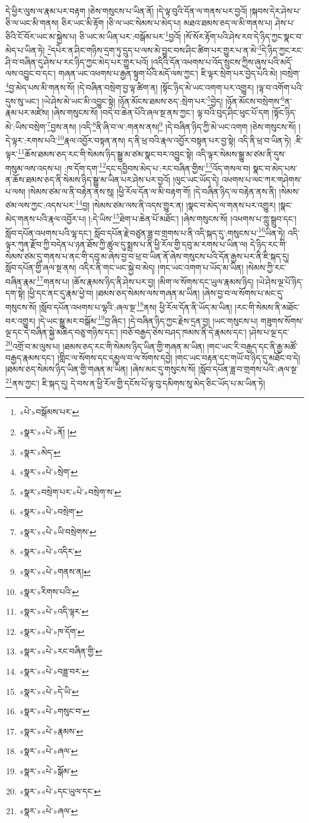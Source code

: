 དེ་ཕྱིར་ལུས་ལ་རྣམ་པར་བརྟག །ཅེས་གསུངས་པ་ཡིན་ནོ། །དེ་ལྟ་བུའི་དོན་ལ་གནས་པར་བྱའོ། །སྐབས་དེར་ཤེས་པ་ཅི་ལ་ཡང་མི་གནས། ཅིར་ཡང་མི་རྟོག །ཅི་ལ་ཡང་སེམས་པ་མེད་པ། མཐའ་ཐམས་ཅད་ལ་མི་གནས་པ། ཤེས་པ་ཅིའི་ངོ་བོར་ཡང་མ་སྐྱེས་པ། ཅི་ཡང་མ་ཡིན་པར་:བསྒོམ་པར་\footnote{«པེ་»བསྒོམས་པར་}བྱའོ། །སོ་སོར་རྟོག་པའི་ཤེས་རབ་དེ་ཉིད་ཀྱང་སྣང་བ་མེད་པ་ཡིན་ཏེ། \footnote{«སྣར་»«པེ་»ནོ། ། }དཔེར་ན་ཤིང་གཉིས་དྲག་ཏུ་དྲུད་པ་ལས་མེ་བྱུང་བས་ཤིང་ཚིག་པར་གྱུར་པ་ན་མེ་\footnote{«སྣར་»མེད་}དེ་ཉིད་ཀྱང་རང་ཤི་བ་བཞིན་དུ་ཤེས་པ་རང་ཉིད་ཀྱང་མེད་པར་གྱུར་པའོ། །འདིའི་དོན་འཕགས་པ་འོད་སྲུངས་ཀྱིས་ཞུས་པའི་མདོ་ལས་འབྱུང་བ་དང་། གཞན་ཡང་འཕགས་པ་རྒྱན་སྟུག་པོའི་མདོ་ལས་ཀྱང་། ཇི་ལྟར་སྲེག་པར་བྱེད་པའི་མེ། །བསྲེག་\footnote{«སྣར་»«པེ་»སྲེག་}བྱ་མེད་པས་མི་གནས་སོ། །དེ་བཞིན་བསྲེག་བྱ་ལྟ་ཚིག་ན། །སྟོང་ཉིད་མེ་ཡང་འགག་པར་འགྱུར། །ལྟ་བ་འགོག་པའི་དུས་སུ་ཡང་། །ཡེ་ཤེས་མེ་ཡང་མི་འབྱུང་སྟེ། །ཉོན་མོངས་ཐམས་ཅད་:སྲེག་པར་\footnote{«སྣར་»བསྲེག་པར་«པེ་»བསྲེག་ས་}བྱེད། །ཉོན་མོངས་བསྲེགས་\footnote{«སྣར་»«པེ་»བསྲེག་}ན་རྣམ་པར་མཛེས། །ཞེས་གསུངས་སོ། །བདེ་བ་ཆེན་པོའི་ཞལ་སྔ་ནས་ཀྱང་། ལྟ་བའི་བུད་ཤིང་ཕུང་པོ་དག །སྟོང་ཉིད་མེ་:ཡིས་བསྲེག་\footnote{«སྣར་»«པེ་»ཡི་བསྲེགས་}བྱས་ནས། །འདི་\footnote{«སྣར་»«པེ་»འདིར་}ནི་ཞི་བ་ལ་:གནས་ནས།\footnote{«སྣར་»«པེ་»གནས་ན།} །དེ་བཞིན་ཉིད་ཀྱི་མེ་ཡང་འགག །ཅེས་གསུངས་སོ། །དེ་ལྟར་:རགས་པའི་\footnote{«སྣར་»རིགས་པའི་}རྣལ་འབྱོར་བསྟན་ནས། ད་ནི་ཕྲ་བའི་རྣལ་འབྱོར་བསྟན་པར་བྱ་སྟེ། འདི་ནི་ཕྲ་བ་ཡིན་ཏེ། :ཇི་ལྟར་\footnote{«སྣར་»«པེ་»འདི་ལྟར་}ཆོས་ཐམས་ཅད་རང་གི་སེམས་ཉིད་སྒྱུ་མ་ཙམ་སྣང་བར་འབྱུང་སྟེ། འདི་ལྟར་སེམས་སྒྱུ་མ་ཙམ་ནི་དུས་གསུམ་ལས་འདས་པ། :ཁ་དོག་དག་\footnote{«སྣར་»«པེ་»ཁ་དོག་}དང་དབྱིབས་མེད་པ་:རང་བཞིན་གྱིས་\footnote{«སྣར་»«པེ་»རང་བཞིན་གྱི་}འོད་གསལ་བ། སྣང་བ་མེད་པས་ན་ཆོས་ཐམས་ཅད་ནི་སེམས་ཉིད་སྒྱུ་མ་ཡིན་པར་ཤེས་པར་བྱའོ། །ལུང་ཡང་ཡོད་དེ། འཕགས་པ་ལང་ཀར་གཤེགས་པ་ལས། །སེམས་ཙམ་ལ་ནི་བརྟེན་ནས་སུ། །ཕྱི་རོལ་དོན་ལ་མི་བརྟག་གོ། །དེ་བཞིན་ཉིད་ལ་བརྟེན་ནས་ནི། །སེམས་ཙམ་ལས་ཀྱང་:འདས་པར་\footnote{«སྣར་»«པེ་»བཟླ་བར་}བྱ། །སེམས་ཙམ་ལས་ནི་འདས་གྱུར་ན། །སྣང་བ་མེད་ལ་གནས་པར་འགྱུར། །སྣང་མེད་གནས་པའི་རྣལ་འབྱོར་པ། །:དེ་ཡིས་\footnote{«སྣར་»«པེ་»དེ་ཡི་}ཐེག་པ་ཆེན་པོ་མཐོང་། །ཞེས་གསུངས་སོ། །འཕགས་པ་ཀླུ་སྒྲུབ་དང་། སློབ་དཔོན་འཕགས་པའི་ལྷ་དང་། སློབ་དཔོན་རྗེ་བཙུན་ཟླ་བ་གྲགས་པ་ནི་འདི་སྐད་དུ་:གསུངས་པ་\footnote{«སྣར་»«པེ་»གསུང་བ་}ཡིན་ཏེ། འདི་ལྟར་ཀུན་རྫོབ་ཀྱི་བདེན་པ་ཉན་ཐོས་ཀྱི་ཚུལ་དུ་སྨྲས་པ་ནི་ཕྱི་རོལ་གྱི་དབུ་མ་རགས་པ་ཡིན་ལ། དེ་ཉིད་རང་གི་སེམས་ཙམ་དུ་གནས་པ་ནང་གི་དབུ་མ་ཞེས་བྱ་བ་ཕྲ་བ་ཡིན་ནོ་ཞེས་གསུངས་པའི་དོན་རྒྱས་པར་ནི་ཇི་སྐད་དུ། སློབ་དཔོན་གྱི་ཞལ་སྔ་ནས། འདིར་ནི་གང་ཡང་སྐྱེ་བ་མེད། །གང་ཡང་འགག་པ་ཡོད་མ་ཡིན། །སེམས་ཀྱི་རང་བཞིན་རྣམ་\footnote{«སྣར་»«པེ་»རྣམས་}གནས་པ། །ཆོས་རྣམས་ཉིད་ནི་ཤེས་པར་བྱ། །མིག་ལ་སོགས་དང་ཡུལ་རྣམས་ཉིད། །ཡེ་ཤེས་ལྔ་པོ་ཉིད་དག་སྟེ། །ཕྱི་དང་ནང་དུ་རྣམ་ཕྱེ་བ། །ཐམས་ཅད་སེམས་ལས་གཞན་མ་ཡིན། །ཞེས་བྱ་བ་ལ་སོགས་པ་མང་དུ་གསུངས་སོ། །སློབ་དཔོན་འཕགས་པ་ལྷའི་:ཞལ་སྔ་\footnote{«སྣར་»«པེ་»ཞལ་}ནས། ཕྱི་རོལ་དོན་ནི་ཡོད་མ་ཡིན། །རང་གི་སེམས་ནི་མཐོང་བར་འགྱུར། །དེ་ཡང་སྒྱུ་མར་བསྒོམ་\footnote{«སྣར་»«པེ་»སྒོམ་}བྱ་ཞིང་། །དེ་བཞིན་ཉིད་ཀྱང་རྗེས་དྲན་བྱ། །ཡང་གསུངས་པ། གཟུགས་སོགས་ལྔ་དང་དེ་བཞིན་སྐྱེ་མཆེད་བཅུ་གཉིས་དང་། །བཅོ་བརྒྱད་ཅེས་བཤད་ཁམས་ནི་དེ་རྣམས་དང་། །ཤེས་པ་ལྔ་དང་\footnote{«སྣར་»«པེ་»དང་ཡུལ་དང་}འགྲོ་བ་མ་ལུས་པ། །ཐམས་ཅད་རང་གི་སེམས་ཉིད་ཡིན་གྱི་གཞན་མ་ཡིན། །གང་ཡང་རི་བརྒྱད་དང་ནི་རྒྱ་མཚོ་བརྒྱད་རྣམས་དང་། །གླིང་ལ་སོགས་དང་དམྱལ་བ་ལ་སོགས་དབྱེ། །གང་ཡང་བརྟན་དང་གཡོ་བ་ཉིད་དུ་མཐོང་བ་དེ། །ཐམས་ཅད་སེམས་ཉིད་ཡིན་གྱི་གཞན་མ་ཡིན། །ཞེས་མང་དུ་གསུངས་སོ། །སློབ་དཔོན་ཟླ་བ་གྲགས་པའི་:ཞལ་སྔ་\footnote{«སྣར་»«པེ་»ཞལ་}ནས་ཀྱང་། ཇི་སྐད་དུ། དེ་བས་ན་ཕྱི་རོལ་གྱི་དངོས་པོ་ལྟ་བུ་དམིགས་སུ་མེད་ཅིང་ཡོད་པ་མ་ཡིན་ཏེ། 
